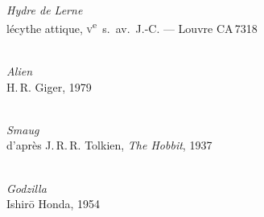 \vspace*{\fill}
\begin{center}

  \begin{minipage}[b]{0.63\textwidth}
    \centering
    \\[0.3em]
    {\small\itshape Hydre de Lerne}\\
    {\footnotesize lécythe attique, \textsc{v}\textsuperscript{e}~s.~av.~J.-C. — Louvre CA\,7318}
  \end{minipage}
  \hfill
  \begin{minipage}[b]{0.34\textwidth}
    \centering
    \\[0.3em]
    {\small\itshape Alien}\\
    {\footnotesize H.\,R. Giger, 1979}
  \end{minipage}

  \vspace{1.2em}

  \begin{minipage}[b]{0.48\textwidth}
    \centering
    \\[0.3em]
    {\small\itshape Smaug}\\
    {\footnotesize d'après J.\,R.\,R. Tolkien, \textit{The Hobbit}, 1937}
  \end{minipage}
  \hfill
  \begin{minipage}[b]{0.48\textwidth}
    \centering
    \\[0.3em]
    {\small\itshape Godzilla}\\
    {\footnotesize Ishirō Honda, 1954}
  \end{minipage}

\end{center}
\vspace*{\fill}

